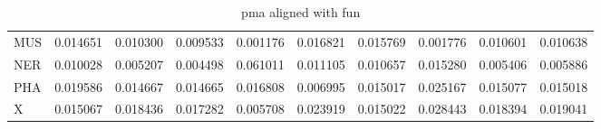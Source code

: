 \begin{table}[H]
\begin{center}
{\begin{tabular}{lrrrrrrrrr}
MUS & {\cellcolor[HTML]{DCF1A5}} \color[HTML]{000000} 0.014651 & {\cellcolor[HTML]{EDF8B1}} \color[HTML]{000000} 0.010300 & {\cellcolor[HTML]{F0F9B4}} \color[HTML]{000000} 0.009533 & {\cellcolor[HTML]{FEFFDF}} \color[HTML]{000000} 0.001176 & {\cellcolor[HTML]{D0EC9F}} \color[HTML]{000000} 0.016821 & {\cellcolor[HTML]{D6EFA2}} \color[HTML]{000000} 0.015769 & {\cellcolor[HTML]{FDFEDB}} \color[HTML]{000000} 0.001776 & {\cellcolor[HTML]{ECF7B1}} \color[HTML]{000000} 0.010601 & {\cellcolor[HTML]{ECF7B1}} \color[HTML]{000000} 0.010638 \\
NER & {\cellcolor[HTML]{EDF8B2}} \color[HTML]{000000} 0.010028 & {\cellcolor[HTML]{FAFDC8}} \color[HTML]{000000} 0.005207 & {\cellcolor[HTML]{FAFDCC}} \color[HTML]{000000} 0.004498 & {\cellcolor[HTML]{004529}} \color[HTML]{F1F1F1} 0.061011 & {\cellcolor[HTML]{EAF7AF}} \color[HTML]{000000} 0.011105 & {\cellcolor[HTML]{ECF7B1}} \color[HTML]{000000} 0.010657 & {\cellcolor[HTML]{D9F0A3}} \color[HTML]{000000} 0.015280 & {\cellcolor[HTML]{F9FDC7}} \color[HTML]{000000} 0.005406 & {\cellcolor[HTML]{F9FDC4}} \color[HTML]{000000} 0.005886 \\
PHA & {\cellcolor[HTML]{C0E597}} \color[HTML]{000000} 0.019586 & {\cellcolor[HTML]{DCF1A5}} \color[HTML]{000000} 0.014667 & {\cellcolor[HTML]{DCF1A5}} \color[HTML]{000000} 0.014665 & {\cellcolor[HTML]{D0EC9F}} \color[HTML]{000000} 0.016808 & {\cellcolor[HTML]{F8FCBD}} \color[HTML]{000000} 0.006995 & {\cellcolor[HTML]{DAF0A4}} \color[HTML]{000000} 0.015017 & {\cellcolor[HTML]{9DD688}} \color[HTML]{000000} 0.025167 & {\cellcolor[HTML]{DAF0A4}} \color[HTML]{000000} 0.015077 & {\cellcolor[HTML]{DAF0A4}} \color[HTML]{000000} 0.015018 \\
X & {\cellcolor[HTML]{DAF0A4}} \color[HTML]{000000} 0.015067 & {\cellcolor[HTML]{C7E89A}} \color[HTML]{000000} 0.018436 & {\cellcolor[HTML]{CEEB9E}} \color[HTML]{000000} 0.017282 & {\cellcolor[HTML]{F9FDC5}} \color[HTML]{000000} 0.005708 & {\cellcolor[HTML]{A6DA8B}} \color[HTML]{000000} 0.023919 & {\cellcolor[HTML]{DAF0A4}} \color[HTML]{000000} 0.015022 & {\cellcolor[HTML]{86CC7F}} \color[HTML]{000000} 0.028443 & {\cellcolor[HTML]{C7E89A}} \color[HTML]{000000} 0.018394 & {\cellcolor[HTML]{C4E799}} \color[HTML]{000000} 0.019041 \\
\bottomrule
\end{tabular}
}\end{center}
\caption{pma aligned with fun}\end{table}